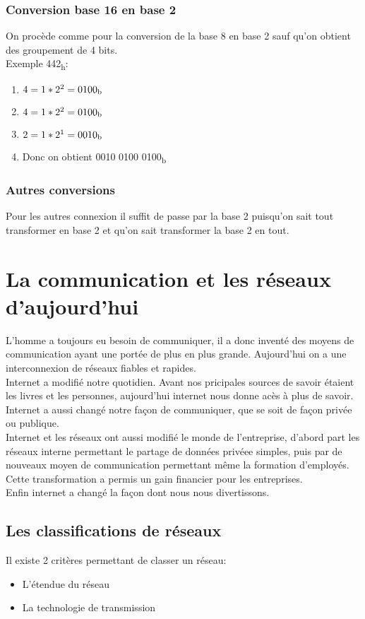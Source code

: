 \documentclass[10pt,a4paper]{article}
\begin{document}
 \subsubsection{Conversion base 16 en base 2}
 On procède comme pour la conversion de la base 8 en base 2 sauf qu'on obtient des groupement de 4 bits.\\
 Exemple 442\textsubscript{h}:
\begin{enumerate}
	 \item $4 = 1*2^2 = 0100\textsubscript{b}$
	 \item $4 = 1*2^2 = 0100\textsubscript{b}$
	 \item $2 = 1*2^1 = 0010\textsubscript{b}$
	 \item Donc on obtient 0010 0100 0100\textsubscript{b}
 \end{enumerate}

 \subsubsection{Autres conversions}
 Pour les autres connexion il suffit de passe par la base 2 puisqu'on sait tout transformer en base 2 et qu'on sait transformer la base 2 en tout.

 \section{La communication et les réseaux d'aujourd'hui}
 L'homme a toujours eu besoin de communiquer, il a donc inventé des moyens de communication ayant une portée de plus en plus grande. Aujourd'hui on a une interconnexion de réseaux fiables et rapides.\\
 Internet a modifié notre quotidien. Avant nos pricipales sources de savoir étaient les livres et les personnes, aujourd'hui internet nous donne acès à plus de savoir.\\
 Internet a aussi changé notre façon de communiquer, que se soit de façon privée ou publique.\\
 Internet et les réseaux ont aussi modifié le monde de l'entreprise, d'abord part les réseaux interne permettant le partage de données privéee simples, puis par de nouveaux moyen de communication permettant même la formation d'employés. Cette transformation a permis un gain financier pour les entreprises.\\
 Enfin internet a changé la façon dont nous nous divertissons.

 \subsection{Les classifications de réseaux}
 Il existe 2 critères permettant de classer un réseau:
 \begin{itemize}
	 \item L'étendue du réseau
	 \item La technologie de transmission
 \end{itemize}
\end{document}
